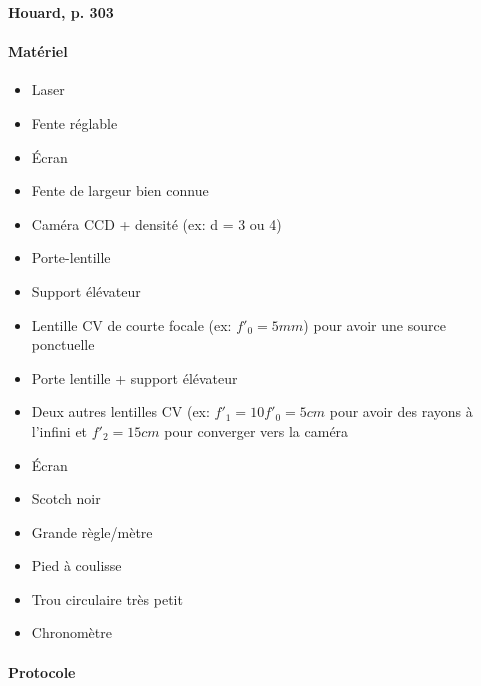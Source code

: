 \documentclass[11pt]{report}
\numberwithin{figure}{section}
\numberwithin{equation}{section}
\numberwithin{table}{section}
\newcommand{\1}{\boldsymbol{1}}
\begin{document}
\textbf{Houard, p. 303}


\begin{tcolorbox}[breakable, enhanced, colback=red!2!white,colframe=mycolor!85!black,title=\textbf{\textbf{Expérience}}]
\paragraph*{Matériel}
\begin{itemize}
\item Laser
\item Fente réglable
\item Écran
\item Fente de largeur bien connue
\item Caméra CCD + densité (ex: d = 3 ou 4)
\item Porte-lentille
\item Support élévateur
\item Lentille CV de courte focale (ex: $f'_0 = 5mm$) pour avoir une source ponctuelle
\item Porte lentille + support élévateur
\item Deux autres lentilles CV (ex: $f'_1 = 10 f'_0 = 5 cm$ pour avoir des rayons à l'infini et $f'_2 = 15 cm$ pour converger vers la caméra
\item Écran
\item Scotch noir
\item Grande règle/mètre
\item Pied à coulisse
\item Trou circulaire très petit
\item Chronomètre
\end{itemize}

\paragraph*{Protocole } 


\end{tcolorbox}
\end{document}
